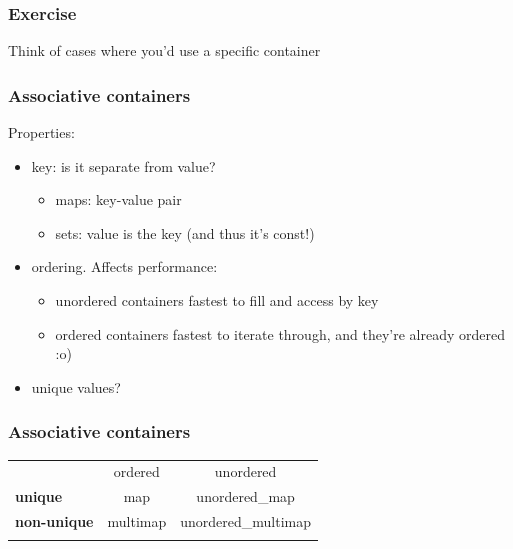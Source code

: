 \subsubsection{Exercise}\label{exercise}

Think of cases where you'd use a specific container

\subsubsection{Associative containers}\label{associative-containers}

Properties:

\begin{itemize}
\itemsep1pt\parskip0pt
\item
  key: is it separate from value?

  \begin{itemize}
  \itemsep1pt\parskip0pt
  \item
    maps: key-value pair
  \item
    sets: value is the key (and thus it's const!)
  \end{itemize}
\item
  ordering. Affects performance:

  \begin{itemize}
  \itemsep1pt\parskip0pt
  \item
    unordered containers fastest to fill and access by key
  \item
    ordered containers fastest to iterate through, and they're already
    ordered :o)
  \end{itemize}
\item
  unique values?
\end{itemize}

\subsubsection{Associative containers}\label{associative-containers-1}

\begin{longtable}[c]{@{}lcc@{}}
\toprule\addlinespace
& ordered & unordered
\\\addlinespace
\midrule\endhead
\textbf{unique} & map & unordered\_map
\\\addlinespace
\textbf{non-unique} & multimap & unordered\_multimap
\\\addlinespace
\bottomrule
\end{longtable}

